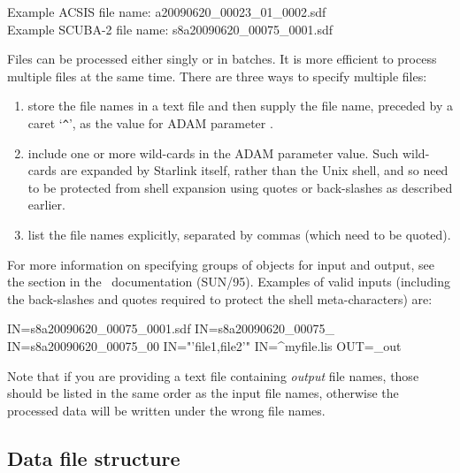 \documentclass[oneside,11pt]{starlink}
\begin{document}
Example ACSIS file name: a20090620\_00023\_01\_0002.sdf\\
Example SCUBA-2 file name: s8a20090620\_00075\_0001.sdf

Files can be processed either singly or in batches. It is more
efficient to process multiple files at the same time. There are three
ways to specify multiple files:

\begin{enumerate}
\item store the file names in a text file and then supply the
file name, preceded by a caret `\verb+^+', as the value for ADAM
parameter .
\item include one or more wild-cards in the ADAM parameter value. Such wild-cards
are expanded by Starlink itself, rather than the Unix shell, and so need to
be protected from shell expansion using quotes or back-slashes as described
earlier.
\item list the file names explicitly, separated by commas (which need to
be quoted).
\end{enumerate}

For more information on specifying groups of objects for input and output,
see the section 
in the \KAPPA\ documentation (SUN/95). Examples of valid inputs (including the
back-slashes and quotes required to protect the shell meta-characters) are:

\begin{terminalv}
IN=s8a20090620_00075_0001.sdf
IN=s8a20090620_00075_\*
IN=s8a20090620_00075_00\?\?
IN="'file1,file2'"
IN=^myfile.lis
OUT=\*_out
\end{terminalv}

Note that if you are providing a text file containing \emph{output} file names,
those should be listed in the same order as the input file names, otherwise the
processed data will be written under the wrong file names.

\subsection{Data file structure}
\end{document}
